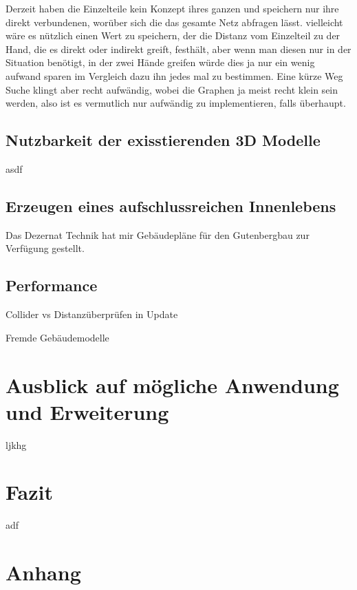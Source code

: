\documentclass[11pt]{article} %
\begin{document}
Derzeit haben die Einzelteile kein Konzept ihres ganzen und speichern nur ihre direkt verbundenen, worüber sich die das gesamte Netz abfragen lässt. vielleicht wäre es nützlich einen Wert zu speichern, der die Distanz vom Einzelteil zu der Hand, die es direkt oder indirekt greift, festhält, aber wenn man diesen nur in der Situation benötigt, in der zwei Hände greifen würde dies ja nur ein wenig aufwand sparen im Vergleich dazu ihn jedes mal zu bestimmen.
Eine kürze Weg Suche klingt aber recht aufwändig, wobei die Graphen ja meist recht klein sein werden, also ist es vermutlich nur aufwändig zu implementieren, falls überhaupt.



\subsection{Nutzbarkeit der exisstierenden 3D Modelle}

asdf

\subsection{Erzeugen eines aufschlussreichen Innenlebens}

Das Dezernat Technik hat mir Gebäudepläne für den Gutenbergbau zur Verfügung gestellt.

\subsection{Performance}

Collider vs Distanzüberprüfen in Update

Fremde Gebäudemodelle




\section{Ausblick auf mögliche Anwendung und Erweiterung}

ljkhg




\section {Fazit}

adf




\section {Anhang}
\end{document}
